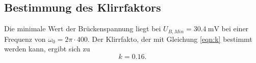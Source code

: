 \subsection{Bestimmung des Klirrfaktors}
Die minimale Wert der Brückenspannung liegt bei $U_{B,Min} = \SI{30.4}{\milli\volt}$ bei einer Frequenz von 
$\omega_0 = 2 \pi \cdot 400$.
\newline
Der Klirrfakto, der mit Gleichung \eqref{eqn:k} bestimmt werden kann, ergibt sich zu
\begin{equation*}
    k = \num{0.16}. %
\end{equation*}